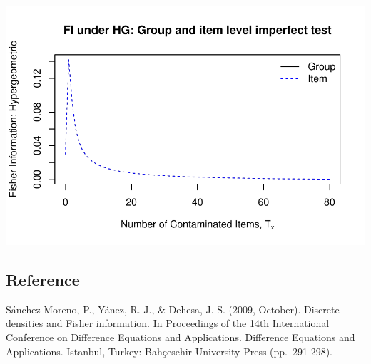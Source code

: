 \documentclass[
]{article}
\begin{document}
\includegraphics[width=1\linewidth]{man/figures/README-FI Item-1}

\subsection{Reference}\label{reference}

Sánchez-Moreno, P., Yánez, R. J., \& Dehesa, J. S. (2009, October).
Discrete densities and Fisher information. In Proceedings of the 14th
International Conference on Difference Equations and Applications.
Difference Equations and Applications. Istanbul, Turkey: Bahçesehir
University Press (pp.~291-298).
\end{document}
